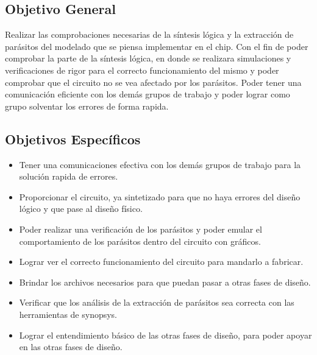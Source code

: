 \subsection*{Objetivo General}

Realizar las comprobaciones necesarias de la síntesis lógica y la extracción de parásitos del modelado que se piensa implementar en el chip.
Con el fin de poder comprobar la parte de la síntesis lógica, en donde se realizara simulaciones y verificaciones de rigor para el correcto funcionamiento del mismo  y poder comprobar que el circuito no se vea afectado por los parásitos.
Poder tener una comunicación eficiente con los demás grupos de trabajo y poder lograr como grupo solventar los errores de forma rapida.






\subsection*{Objetivos Específicos}
\begin{itemize}

\item Tener una comunicaciones efectiva con los demás grupos de trabajo para la solución rapida de errores.
\item Proporcionar el circuito, ya sintetizado para que no haya errores del diseño lógico y que pase al diseño físico.
\item Poder realizar una verificación de los parásitos y poder emular el comportamiento de los parásitos dentro del circuito con gráficos. 
\item Lograr ver el correcto funcionamiento del circuito para mandarlo a fabricar.
\item Brindar los archivos necesarios para que puedan pasar a otras fases de diseño.
\item Verificar que los análisis de la extracción de parásitos sea correcta con las herramientas de synopsys. 
\item Lograr el entendimiento básico de las otras fases de diseño, para poder apoyar en las otras fases de diseño.

\end{itemize}